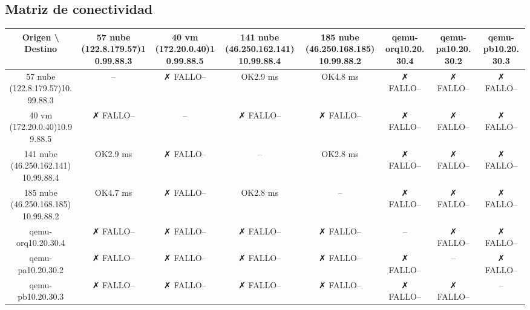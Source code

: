 \documentclass[11pt,a4paper]{article}
\begin{document}
\subsection{Matriz de conectividad}
\begin{longtable}{|c|c|c|c|c|c|c|c|}
\hline
Origen \textbackslash{} Destino & 57 nube (122.8.179.57)10.99.88.3 & 40 vm (172.20.0.40)10.99.88.5 & 141 nube (46.250.162.141)10.99.88.4 & 185 nube (46.250.168.185)10.99.88.2 & qemu-orq10.20.30.4 & qemu-pa10.20.30.2 & qemu-pb10.20.30.3 \\ \hline
57 nube (122.8.179.57)10.99.88.3 & -- & ✗ FALLO-- & OK2.9 ms & OK4.8 ms & ✗ FALLO-- & ✗ FALLO-- & ✗ FALLO-- \\ \hline
40 vm (172.20.0.40)10.99.88.5 & ✗ FALLO-- & -- & ✗ FALLO-- & ✗ FALLO-- & ✗ FALLO-- & ✗ FALLO-- & ✗ FALLO-- \\ \hline
141 nube (46.250.162.141)10.99.88.4 & OK2.9 ms & ✗ FALLO-- & -- & OK2.8 ms & ✗ FALLO-- & ✗ FALLO-- & ✗ FALLO-- \\ \hline
185 nube (46.250.168.185)10.99.88.2 & OK4.7 ms & ✗ FALLO-- & OK2.8 ms & -- & ✗ FALLO-- & ✗ FALLO-- & ✗ FALLO-- \\ \hline
qemu-orq10.20.30.4 & ✗ FALLO-- & ✗ FALLO-- & ✗ FALLO-- & ✗ FALLO-- & -- & ✗ FALLO-- & ✗ FALLO-- \\ \hline
qemu-pa10.20.30.2 & ✗ FALLO-- & ✗ FALLO-- & ✗ FALLO-- & ✗ FALLO-- & ✗ FALLO-- & -- & ✗ FALLO-- \\ \hline
qemu-pb10.20.30.3 & ✗ FALLO-- & ✗ FALLO-- & ✗ FALLO-- & ✗ FALLO-- & ✗ FALLO-- & ✗ FALLO-- & -- \\ \hline
\end{longtable}
\end{document}
